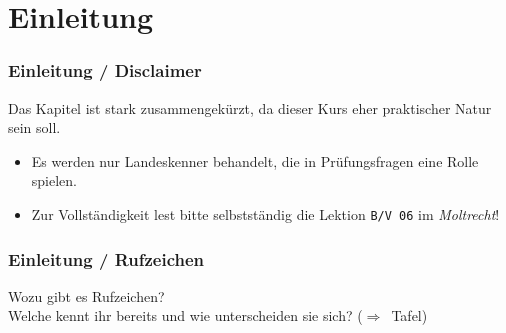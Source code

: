 

\subtitle{Betriebstechnik/Vorschriften 06: \\
  Rufzeichen - Landeskenner \\[2em]}
\date{Stand 31.10.2016}



\section{Einleitung}

\begin{frame}
  \frametitle{Einleitung / Disclaimer}

  \begin{center}
    \Large{Das Kapitel ist stark zusammengekürzt, da dieser Kurs eher
    praktischer Natur sein soll.}
  \end{center}

  \normalsize

  \begin{itemize}
    \item Es werden nur Landeskenner behandelt, die in Prüfungsfragen eine Rolle spielen.
    \item Zur Vollständigkeit lest bitte selbstständig die Lektion
      \texttt{B/V 06} im \emph{Moltrecht}!
  \end{itemize}

\end{frame}


\begin{frame}
  \frametitle{Einleitung / Rufzeichen}

  \begin{center}
    \Large{Wozu gibt es Rufzeichen?} \\[1em]
    \Large{Welche kennt ihr bereits und wie unterscheiden sie sich? ($\Rightarrow$~Tafel)}
  \end{center}

\end{frame}

